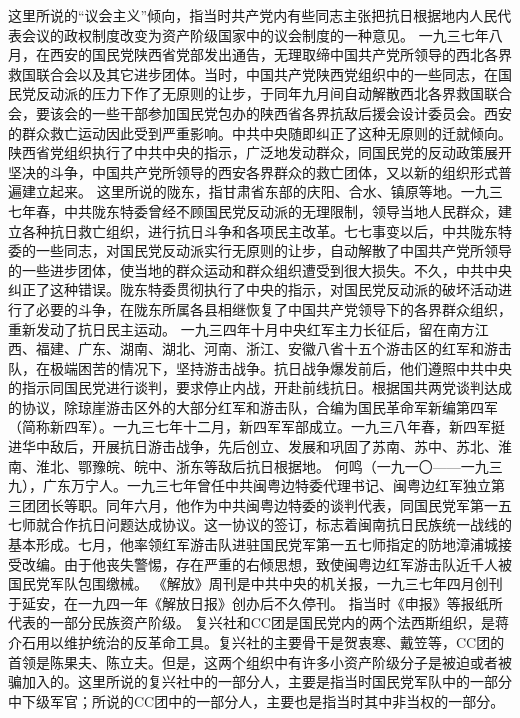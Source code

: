 \begin{maonote}
这里所说的“议会主义”倾向，指当时共产党内有些同志主张把抗日根据地内人民代表会议的政权制度改变为资产阶级国家中的议会制度的一种意见。
一九三七年八月，在西安的国民党陕西省党部发出通告，无理取缔中国共产党所领导的西北各界救国联合会以及其它进步团体。当时，中国共产党陕西党组织中的一些同志，在国民党反动派的压力下作了无原则的让步，于同年九月间自动解散西北各界救国联合会，要该会的一些干部参加国民党包办的陕西省各界抗敌后援会设计委员会。西安的群众救亡运动因此受到严重影响。中共中央随即纠正了这种无原则的迁就倾向。陕西省党组织执行了中共中央的指示，广泛地发动群众，同国民党的反动政策展开坚决的斗争，中国共产党所领导的西安各界群众的救亡团体，又以新的组织形式普遍建立起来。
这里所说的陇东，指甘肃省东部的庆阳、合水、镇原等地。一九三七年春，中共陇东特委曾经不顾国民党反动派的无理限制，领导当地人民群众，建立各种抗日救亡组织，进行抗日斗争和各项民主改革。七七事变以后，中共陇东特委的一些同志，对国民党反动派实行无原则的让步，自动解散了中国共产党所领导的一些进步团体，使当地的群众运动和群众组织遭受到很大损失。不久，中共中央纠正了这种错误。陇东特委贯彻执行了中央的指示，对国民党反动派的破坏活动进行了必要的斗争，在陇东所属各县相继恢复了中国共产党领导下的各界群众组织，重新发动了抗日民主运动。
一九三四年十月中央红军主力长征后，留在南方江西、福建、广东、湖南、湖北、河南、浙江、安徽八省十五个游击区的红军和游击队，在极端困苦的情况下，坚持游击战争。抗日战争爆发前后，他们遵照中共中央的指示同国民党进行谈判，要求停止内战，开赴前线抗日。根据国共两党谈判达成的协议，除琼崖游击区外的大部分红军和游击队，合编为国民革命军新编第四军（简称新四军）。一九三七年十二月，新四军军部成立。一九三八年春，新四军挺进华中敌后，开展抗日游击战争，先后创立、发展和巩固了苏南、苏中、苏北、淮南、淮北、鄂豫皖、皖中、浙东等敌后抗日根据地。
何鸣（一九一〇——一九三九），广东万宁人。一九三七年曾任中共闽粤边特委代理书记、闽粤边红军独立第三团团长等职。同年六月，他作为中共闽粤边特委的谈判代表，同国民党军第一五七师就合作抗日问题达成协议。这一协议的签订，标志着闽南抗日民族统一战线的基本形成。七月，他率领红军游击队进驻国民党军第一五七师指定的防地漳浦城接受改编。由于他丧失警惕，存在严重的右倾思想，致使闽粤边红军游击队近千人被国民党军队包围缴械。
《解放》周刊是中共中央的机关报，一九三七年四月创刊于延安，在一九四一年《解放日报》创办后不久停刊。
指当时《申报》等报纸所代表的一部分民族资产阶级。
复兴社和CC团是国民党内的两个法西斯组织，是蒋介石用以维护统治的反革命工具。复兴社的主要骨干是贺衷寒、戴笠等，CC团的首领是陈果夫、陈立夫。但是，这两个组织中有许多小资产阶级分子是被迫或者被骗加入的。这里所说的复兴社中的一部分人，主要是指当时国民党军队中的一部分中下级军官；所说的CC团中的一部分人，主要也是指当时其中非当权的一部分。
\end{maonote}
